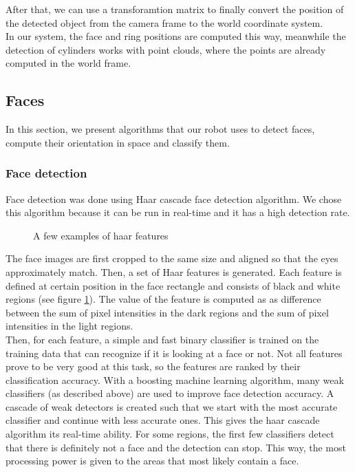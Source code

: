 \documentclass[12pt,a4paper]{article}
\begin{document}
	After that, we can use a transforamtion matrix to finally convert the position of the detected object from the camera frame to the world coordinate system. \\ 
	
	In our system, the face and ring positions are computed this way, meanwhile the detection of cylinders works with point clouds, where the points are already computed in the world frame.
	
	\subsection{Faces}
	In this section, we present algorithms that our robot uses to detect faces, compute their orientation in space and classify them.
	
	\subsubsection{Face detection} \label{face_detection_algorithm}
	
	Face detection was done using Haar cascade face detection algorithm. We chose this algorithm because it can be run in real-time and it has a high detection rate. \\
	
	\begin{figure}[h]
		\centering
		\caption{A few examples of haar features}
		\label{fig:haar_features}
	\end{figure}
	
	The face images are first cropped to the same size and aligned so that the eyes approximately match. Then, a set of Haar features is generated. Each feature is defined at certain position in the face rectangle and consists of black and white regions (see figure \ref{fig:haar_features}). The value of the feature is computed as as difference between the sum of pixel intensities in the dark regions and the sum of pixel intensities in the light regions. \\
	
	Then, for each feature, a simple and fast binary classifier is trained on the training data that can recognize if it is looking at a face or not. Not all features prove to be very good at this task, so the features are ranked by their classification accuracy. With a boosting machine learning algorithm, many weak classifiers (as described above) are used to improve face detection accuracy. A cascade of weak detectors is created such that we start with the most accurate classifier and continue with less accurate ones. This gives the haar cascade algorithm its real-time ability. For some regions, the first few classifiers detect that there is definitely not a face and the detection can stop. This way, the most processing power is given to the areas that most likely contain a face. \\
	
\end{document}
